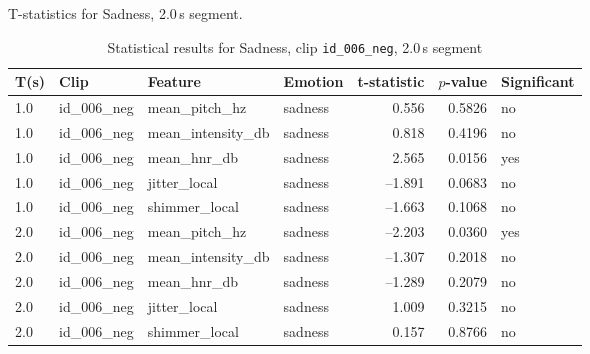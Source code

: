     \begin{table}
      \centering
      \caption{T-statistics for Sadness, 2.0\,s segment.}
      \label{tab:ttest_sadness_2s}
      \begin{tabular}{l l l l r r l}
        \toprule
        T(s) & Clip           & Feature             & Emotion & t-statistic & $p$-value & Significant \\
        \midrule
        1.0 & id\_006\_neg & mean\_pitch\_hz     & sadness &  0.556 & 0.5826 & no  \\
      1.0 & id\_006\_neg & mean\_intensity\_db & sadness &  0.818 & 0.4196 & no  \\
      1.0 & id\_006\_neg & mean\_hnr\_db       & sadness &  2.565 & 0.0156 & yes \\
      1.0 & id\_006\_neg & jitter\_local       & sadness & –1.891 & 0.0683 & no  \\
      1.0 & id\_006\_neg & shimmer\_local      & sadness & –1.663 & 0.1068 & no  \\
        2.0 & id\_006\_neg & mean\_pitch\_hz     & sadness & –2.203 & 0.0360 & yes \\
        2.0 & id\_006\_neg & mean\_intensity\_db & sadness & –1.307 & 0.2018 & no  \\
        2.0 & id\_006\_neg & mean\_hnr\_db       & sadness & –1.289 & 0.2079 & no  \\
        2.0 & id\_006\_neg & jitter\_local       & sadness &  1.009 & 0.3215 & no  \\
        2.0 & id\_006\_neg & shimmer\_local      & sadness &  0.157 & 0.8766 & no  \\
        \bottomrule
      \end{tabular}

    \caption{Statistical results for Sadness, clip \texttt{id\_006\_neg}, 2.0\,s segment}
    \label{tab:clip006_neg_stats2}
  \end{table}
  
  